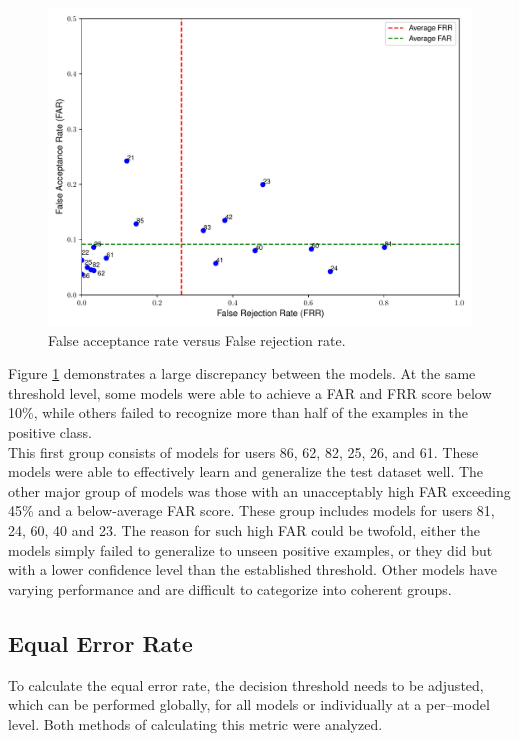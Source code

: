 \begin{figure}[H]
	\centering
	\includegraphics[width=\textwidth]{images/far_vs_frr.pdf} 	
	\caption{False acceptance rate versus False rejection rate.}
	\label{fig:frr_vs_far_all_models_base}
\end{figure}

Figure \ref{fig:frr_vs_far_all_models_base} demonstrates a large discrepancy between the models. At the same threshold level, some models were able to achieve a FAR and FRR score below 10\%, while others failed to recognize more than half of the examples in the positive class. \\
This first group consists of models for users 86, 62, 82, 25, 26, and 61. These models were able to effectively learn and generalize the test dataset well.
The other major group of models was those with an unacceptably high FAR exceeding 45\% and a below-average FAR score. These group includes models for users 81, 24, 60, 40 and 23. The reason for such high FAR could be twofold, either the models simply failed to generalize to unseen positive examples, or they did but with a lower confidence level than the established threshold. Other models have varying performance and are difficult to categorize into coherent groups.

\subsection{Equal Error Rate} \label{subsec_eer}
To calculate the equal error rate, the decision threshold needs to be adjusted, which can be performed globally, for all models or individually at a per--model level. Both methods of calculating this metric were analyzed.

